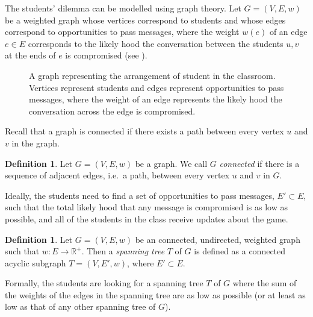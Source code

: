 \documentclass[a4paper,11pt]{report}
\theoremstyle{plain}
\theoremstyle{definition}
\newtheorem{defn}[thm]{Definition}
\begin{document}
The students' dilemma can be modelled using graph theory. Let $G = (V, E, w)$ be
a weighted graph whose vertices correspond to students and whose edges
correspond to opportunities to pass messages, where the weight $w(e)$ of an edge
$e \in E$ corresponds to the likely hood the conversation between the students
$u,v$ at the ends of $e$ is compromised (see ).

\begin{figure}[h]
\centering
\caption{A graph representing the arrangement of student in the classroom.
Vertices represent students and edges represent opportunities to pass messages,
where the weight of an edge represents the likely hood the conversation
across the edge is compromised.}
\label{fig:class-graph}
\end{figure}

Recall that a graph is connected if there exists a path between every vertex
$u$ and $v$ in the graph.

\begin{defn}
Let $G = (V, E, w)$ be a graph. We call $G$ \emph{connected} if there is
a sequence of adjacent edges, i.e.~a path,  between every vertex $u$ and $v$
in $G$.
\end{defn}

Ideally, the students need to find a set of opportunities to pass messages,
$E' \subset E$, such that the total likely hood that any message is
compromised is as low as possible, and all of the students in the class
receive updates about the game.

\begin{defn}
Let $G = (V, E, w)$ be an connected, undirected, weighted graph such that
$w : E \to \mathbb{R}^+$. Then a \emph{spanning tree} $T$ of $G$ is defined as
a connected acyclic subgraph $T = (V, E', w)$, where $E' \subset E$.
\end{defn}

Formally, the students are looking for a spanning tree $T$ of $G$ where the
sum of the weights of the edges in the spanning tree are as low as possible
(or at least as low as that of any other spanning tree of $G$).
\end{document}
